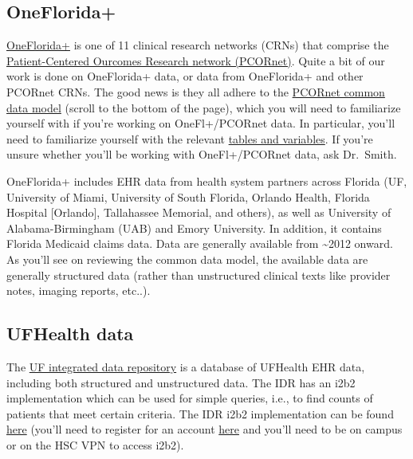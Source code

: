 \documentclass[
  letterpaper,
  DIV=11,
  numbers=noendperiod]{scrreprt}
\begin{document}
\hypertarget{oneflorida}{%
\subsection{OneFlorida+}\label{oneflorida}}

\href{https://onefloridaconsortium.org/}{OneFlorida+} is one of 11
clinical research networks (CRNs) that comprise the
\href{https://www.pcornet.org/}{Patient-Centered Ourcomes Research
network (PCORnet)}. Quite a bit of our work is done on OneFlorida+ data,
or data from OneFlorida+ and other PCORnet CRNs. The good news is they
all adhere to the \href{https://pcornet.org/data/}{PCORnet common data
model} (scroll to the bottom of the page), which you will need to
familiarize yourself with if you're working on OneFl+/PCORnet data. In
particular, you'll need to familiarize yourself with the relevant
\href{https://pcornet.org/wp-content/uploads/2022/01/PCORnet-Common-Data-Model-v60-2020_10_221.pdf}{tables
and variables}. If you're unsure whether you'll be working with
OneFl+/PCORnet data, ask Dr.~Smith.

OneFlorida+ includes EHR data from health system partners across Florida
(UF, University of Miami, University of South Florida, Orlando Health,
Florida Hospital {[}Orlando{]}, Tallahassee Memorial, and others), as
well as University of Alabama-Birmingham (UAB) and Emory University. In
addition, it contains Florida Medicaid claims data. Data are generally
available from \textasciitilde2012 onward. As you'll see on reviewing
the common data model, the available data are generally structured data
(rather than unstructured clinical texts like provider notes, imaging
reports, etc..).

\hypertarget{ufhealth-data}{%
\subsection{UFHealth data}\label{ufhealth-data}}

The \href{https://idr.ufhealth.org/}{UF integrated data repository} is a
database of UFHealth EHR data, including both structured and
unstructured data. The IDR has an i2b2 implementation which can be used
for simple queries, i.e., to find counts of patients that meet certain
criteria. The IDR i2b2 implementation can be found
\href{https://i2b2.idr.ufhealth.org/}{here} (you'll need to register for
an account
\href{https://idr.ufhealth.org/research-services/feasibility-cohort-discovery/}{here}
and you'll need to be on campus or on the HSC VPN to access i2b2).
\end{document}
